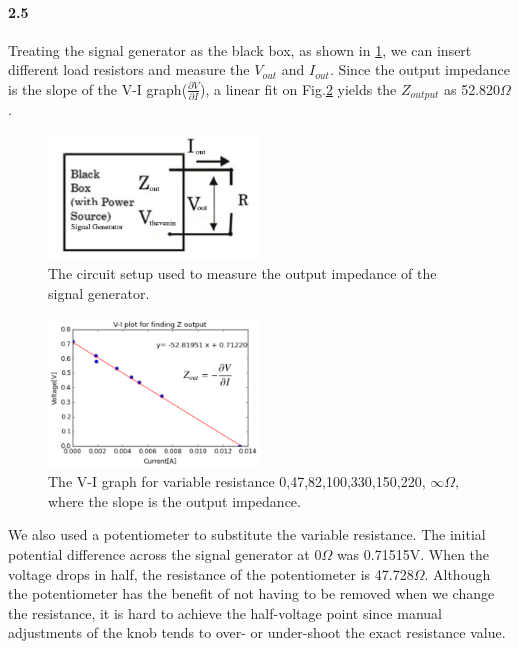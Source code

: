 \documentclass[authoryear, 12pt,5p, times]{elsarticle}
\begin{document}
\paragraph{\textbf{2.5}}
 Treating the signal generator as the black box, as shown in \ref{Z_output_setup}, we can insert different load resistors and measure the $V_{out}$ and $I_{out}$. Since the output impedance is the slope of the V-I graph($\frac{\partial V}{\partial I}$), a linear fit on Fig.\ref{Z_output_plots} yields the $Z_{output} $ as 52.820$\Omega$.
\begin{figure}[h!]
\includegraphics[width=0.5\textwidth]{figure/Z_output_setup}
\caption{The circuit setup used to measure the output impedance of the signal generator.}
\label{Z_output_setup}
\end{figure}

\begin{figure}[h!]
\includegraphics[width=0.5\textwidth]{figure/Z_output_plot}
\caption{The V-I graph for variable resistance 0,47,82,100,330,150,220, $\infty \Omega$, where the slope is the output impedance.}
\label{Z_output_plots}
\end{figure}
We also used a potentiometer to substitute the variable resistance. The initial potential difference across the signal generator at 0$\Omega$ was 0.71515V. When the voltage drops in half, the resistance of the potentiometer is 47.728$\Omega$. Although the potentiometer has the benefit of not having to be removed when we change the resistance, it is hard to achieve the half-voltage point since manual adjustments of the knob tends to over- or under-shoot the exact resistance value.
\end{document}
